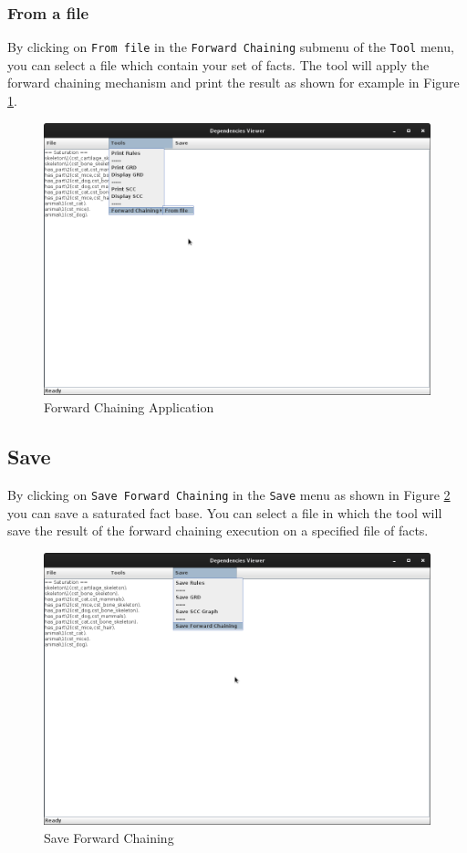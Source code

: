 \documentclass[a4paper, 10pt]{article}
\begin{document}
\subsubsection{From a file}
By clicking on \verb=From file= in the \verb=Forward Chaining= submenu of the \verb=Tool= menu, you can select a file which contain your set of facts. The tool will apply the forward chaining mechanism and print the result as shown for example in Figure \ref{fig10}.
\begin{figure}
\begin{center}
  \includegraphics[scale=0.25]{pics/fig10.png}
  \caption{Forward Chaining Application}
\end{center}
\label{fig10}
\end{figure}

\subsection{Save}
By clicking on \verb=Save Forward Chaining= in the \verb=Save= menu as shown in Figure \ref{fig11} you can save a saturated fact base. You can select a file in which the tool will save the result of the forward chaining execution on a specified file of facts.
\begin{figure}
\begin{center}
  \includegraphics[scale=0.25]{pics/fig11.png}
  \caption{Save Forward Chaining}
\end{center}
\label{fig11}
\end{figure}
\end{document}
